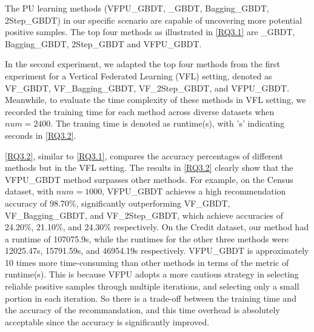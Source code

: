 \documentclass[10pt,journal,compsoc]{IEEEtran}
\begin{document}
The PU learning methods (VFPU\_GBDT, \_GBDT, Bagging\_GBDT, 2Step\_GBDT) in our specific scenario are capable of uncovering more potential positive samples. The top four methods as illustrated in \autoref{RQ3.1} are \_GBDT, Bagging\_GBDT, 2Step\_GBDT and VFPU\_GBDT. 

In the second experiment, we adapted the top four methods from the first experiment for a Vertical Federated Learning (VFL) setting, denoted as VF\_GBDT, VF\_Bagging\_GBDT, VF\_2Step\_GBDT, and VFPU\_GBDT. Meanwhile, to evaluate the time complexity of these methods in VFL setting, we recorded the training time for each method across diverse datasets when $num = 2400$. The traning time is denoted as runtime(s), with 's' indicating seconds in \autoref{RQ3.2}.
 

\autoref{RQ3.2}, similar to \autoref{RQ3.1}, compares the accuracy percentages of different methods but  in the VFL setting. The results in \autoref{RQ3.2} clearly show that the VFPU\_GBDT method surpasses other methods. For example, on the Census dataset, with $num=1000$, VFPU\_GBDT achieves a high recommendation accuracy of 98.70\%, significantly outperforming VF\_GBDT, VF\_Bagging\_GBDT, and VF\_2Step\_GBDT, which achieve accuracies of 24.20\%, 21.10\%, and 24.30\% respectively. On the Credit dataset, our method had a runtime of 107075.9s, while the runtimes for the other three methods were 12025.47s, 15791.59s, and 46954.19s respectively.
VFPU\_GBDT is approximately 10 times more time-consuming than other methods in terms of the metric of runtime(s). This is because VFPU adopts a more cautious strategy in selecting reliable positive samples through multiple iterations, and selecting only a small portion in each iteration. So there is a trade-off between the training time and the accuracy of the recommandation, and this time overhead is absolutely acceptable since the accuracy is significantly improved.
\end{document}
